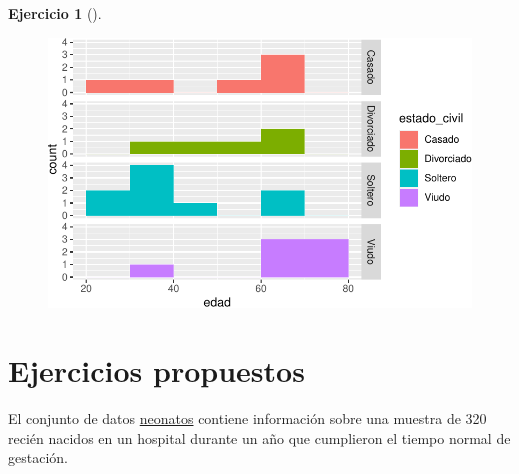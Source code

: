\documentclass[
  a4paper,
]{scrreport}
\theoremstyle{definition}
\newtheorem{exercise}{Ejercicio}[chapter]
\theoremstyle{remark}
\begin{document}
\begin{exercise}[]
\begin{tcolorbox}
\begin{figure}[H]

{\centering \includegraphics{./03-frecuencias-graficos_files/figure-pdf/unnamed-chunk-33-1.pdf}

}

\end{figure}

\end{tcolorbox}

\end{exercise}

\hypertarget{ejercicios-propuestos-1}{%
\section{Ejercicios propuestos}\label{ejercicios-propuestos-1}}

El conjunto de datos \href{datos/neonatos.csv}{neonatos} contiene
información sobre una muestra de 320 recién nacidos en un hospital
durante un año que cumplieron el tiempo normal de gestación.
\end{document}
